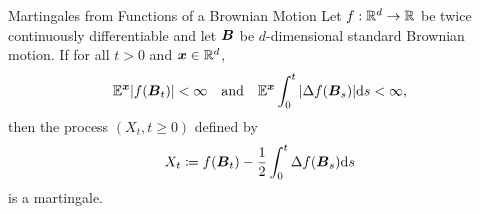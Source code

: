 \begin{thm}{Martingales from Functions of a Brownian Motion}{}
	Let \(f : \mathbb{R}^d \to \mathbb{R}\) be twice continuously differentiable and let \(\boldsymbol{B}\) be \(d\)-dimensional standard Brownian motion. If for all \(t > 0\) and \(\boldsymbol{x} \in \mathbb{R}^d\),
	\begin{equation*}
		\mathbb{E}^{\boldsymbol{x}} |f(\boldsymbol{B}_t)| < \infty \quad \text{and} \quad \mathbb{E}^{\boldsymbol{x}} \int_0^t |\Delta f(\boldsymbol{B}_s)| \mathrm{d} s < \infty,
	\end{equation*}
	then the process \((X_t, t \ge 0)\) defined by
	\begin{equation}
		X_t \coloneqq f(\boldsymbol{B}_t) - \frac{1}{2} \int_0^t \Delta f(\boldsymbol{B}_s) \mathrm{d} s
		\label{eq:MartingaleFunctionProcess}
	\end{equation}
	is a martingale.
\end{thm}
